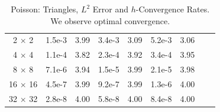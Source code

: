 \begin{table}[h!b!p!]
\begin{center}
\begin{tabular}{| c | c | c | c | c | c | c | c | c |}
2 $\times$ 2         	&1.5e-3	&3.99	&3.4e-3	&3.09	&5.2e-3     	&3.06	\\
4 $\times$ 4        	&1.1e-4	&3.82	&2.3e-4	&3.92	&3.4e-4     	&3.95	\\
8 $\times$ 8         	&7.1e-6	&3.94	&1.5e-5	&3.99	&2.1e-5     	&3.98	\\
16 $\times$ 16         	&4.5e-7	&3.99	&9.2e-7	&3.99	&1.3e-6     	&4.00	\\
32 $\times$ 32         	&2.8e-8	&4.00	&5.8e-8	&4.00	&8.4e-8      	&4.00	\\
\hline
\end{tabular}
\end{center} 
\caption{Poisson: Triangles, $L^{2}$ Error and $h$-Convergence Rates.  We observe optimal convergence.}
\label{NVR:table:poissonTriRates}
\end{table}

